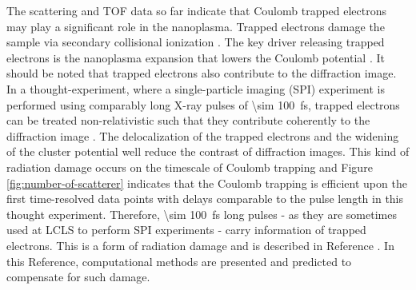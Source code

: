 %
The scattering and TOF data so far indicate that Coulomb trapped electrons may play a significant role in the nanoplasma. Trapped electrons damage the sample via secondary collisional ionization \cite{Hau-Riege-2004-PRE}. The key driver releasing trapped electrons is the nanoplasma expansion that lowers the Coulomb potential \cite{Arbeiter-2011-NJP}. It should be noted that trapped electrons also contribute to the diffraction image. In a thought-experiment, where a single-particle imaging (SPI) experiment is performed using comparably long X-ray pulses of \SI{\sim 100}{\femto\second}, trapped electrons can be treated non-relativistic such that they contribute coherently to the diffraction image \cite{Williams-2016-PC}. The delocalization of the trapped electrons and the widening of the cluster potential well reduce the contrast of diffraction images. This kind of radiation damage occurs on the timescale of Coulomb trapping and Figure \ref{fig:number-of-scatterer} indicates that the Coulomb trapping is efficient upon the first time-resolved data points with delays comparable to the pulse length in this thought experiment. Therefore, \SI{\sim 100}{\femto\second} long pulses - as they are sometimes used at LCLS to perform SPI experiments - carry information of trapped electrons. This is a form of radiation damage and is described in Reference \citep{Quiney-2010-NatPhys}. In this Reference, computational methods are presented and predicted to compensate for such damage.\\[1\baselineskip]
%
